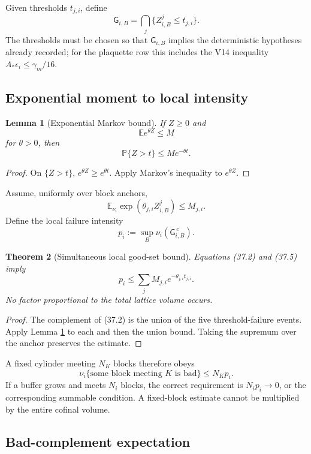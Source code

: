 \documentclass[11pt]{article}
\newtheorem{theorem}{Theorem}[section]
\newtheorem{lemma}[theorem]{Lemma}
\begin{document}
Given thresholds \(t_{j,i}\), define
\[
 \mathsf G_{i,B}
 =
 \bigcap_j\{Z^j_{i,B}\leq t_{j,i}\}.
 \tag{37.2}
\]
The thresholds must be chosen so that \(\mathsf G_{i,B}\) implies the
deterministic hypotheses already recorded; for the plaquette row this
includes the V14 inequality
\(A_*\epsilon_i\leq\gamma_m/16\).

\subsection{Exponential moment to local intensity}

\begin{lemma}[Exponential Markov bound]
\label{lem:v11v37-markov}
If \(Z\geq0\) and
\[
 \mathbb E e^{\theta Z}\leq M
 \tag{37.3}
\]
for \(\theta>0\), then
\[
 \mathbb P\{Z>t\}\leq M e^{-\theta t}.
 \tag{37.4}
\]
\end{lemma}

\begin{proof}
On \(\{Z>t\}\), \(e^{\theta Z}\geq e^{\theta t}\).  Apply Markov's
inequality to \(e^{\theta Z}\).
\end{proof}

Assume, uniformly over block anchors,
\[
 \mathbb E_{\nu_i}
 \exp(\theta_{j,i}Z^j_{i,B})
 \leq M_{j,i}.
 \tag{37.5}
\]
Define the local failure intensity
\[
 p_i:=
 \sup_B\nu_i(\mathsf G_{i,B}^{\,c}).
 \tag{37.6}
\]

\begin{theorem}[Simultaneous local good-set bound]
\label{thm:v11v37-local-intensity}
Equations (37.2) and (37.5) imply
\[
 p_i
 \leq
 \sum_j M_{j,i}e^{-\theta_{j,i}t_{j,i}}.
 \tag{37.7}
\]
No factor proportional to the total lattice volume occurs.
\end{theorem}

\begin{proof}
The complement of (37.2) is the union of the five threshold-failure
events.  Apply Lemma \ref{lem:v11v37-markov} to each and then the union
bound.  Taking the supremum over the anchor preserves the estimate.
\end{proof}

A fixed cylinder meeting \(N_K\) blocks therefore obeys
\[
 \nu_i\{\text{some block meeting }K\text{ is bad}\}
 \leq N_Kp_i.
 \tag{37.8}
\]
If a buffer grows and meets \(N_i\) blocks, the correct requirement is
\(N_ip_i\to0\), or the corresponding summable condition.  A
fixed-block estimate cannot be multiplied by the entire cofinal volume.

\subsection{Bad-complement expectation}
\end{document}
